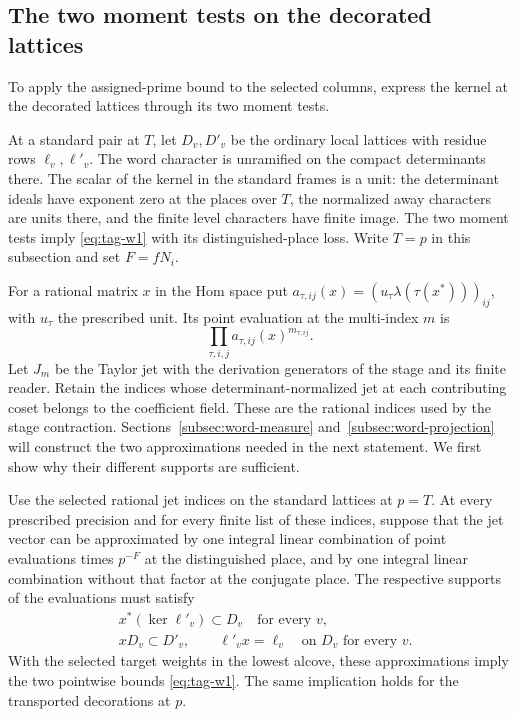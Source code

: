 \subsection{The two moment tests on the decorated lattices}
\label{subsec:word-moments}

To apply the assigned-prime bound to the selected columns, express the kernel at the decorated lattices through its two moment tests.

At a standard pair at \(T\), let \(D_v,D'_v\) be the ordinary
local lattices with residue rows \(\ell_v,\ell'_v\). The word
character is unramified on the compact determinants there.
The scalar of the kernel in the standard frames is a unit:
the determinant ideals have exponent zero at the places over
\(T\), the normalized away characters are units there, and
the finite level characters have finite image. The two moment tests imply \eqref{eq:tag-w1} with its distinguished-place loss. Write \(T=p\) in this subsection and set
\(F=fN_i\).

For a rational matrix \(x\) in the Hom space put \(a_{\tau,ij}(x)=(u_\tau\lambda(\tau(x^*)))_{ij}\), with \(u_\tau\) the prescribed unit. Its point evaluation at the multi-index \(m\) is
\[
  \prod_{\tau,i,j}a_{\tau,ij}(x)^{m_{\tau,ij}}.
\]
 Let \(J_m\) be the Taylor jet with the
derivation generators of the stage and its finite reader.
Retain the indices whose determinant-normalized
jet at each contributing coset belongs to the coefficient field.
These are the rational indices used by the stage contraction.
Sections~\ref{subsec:word-measure} and~\ref{subsec:word-projection}
will construct the two approximations needed in the next statement.
We first show why their different supports are sufficient.

\begin{proposition}\label{prop:word-moment-criterion}
Use the selected rational jet indices on the standard lattices at
\(p=T\). At every prescribed precision and for every finite list
of these indices, suppose that the jet vector can be approximated
by one integral linear combination of point evaluations times
\(p^{-F}\) at the distinguished place, and by one integral linear
combination without that factor at the conjugate place. The
respective supports of the evaluations must satisfy
\[
\begin{aligned}
 &x^*(\ker\ell'_v)\subset D_v\quad\text{for every }v,\\
 &xD_v\subset D'_v,\qquad \ell'_v x=\ell_v
                      \quad\text{on }D_v\text{ for every }v .
\end{aligned}                                                     \tag{W6}\label{eq:tag-w6}
\]
With the selected target weights in the lowest alcove, these
approximations imply the two pointwise bounds \eqref{eq:tag-w1}. The same
implication holds for the transported decorations at \(p\).
\end{proposition}

